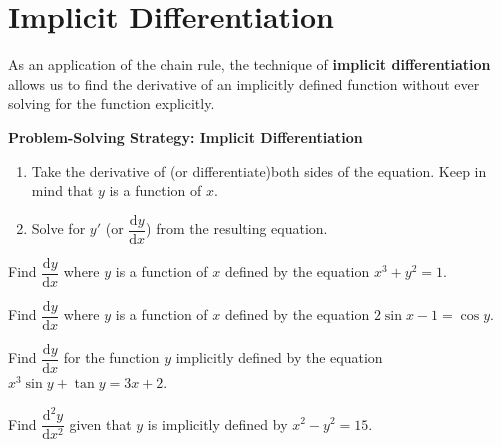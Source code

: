 
\hypertarget{implicit-differentiation}{%
\section{Implicit Differentiation}\label{implicit-differentiation}}

As an application of the chain rule, the technique of \textbf{implicit
differentiation} allows us to find the derivative of an implicitly
defined function without ever solving for the function explicitly.

\textbf{Problem-Solving Strategy: Implicit Differentiation}

\begin{enumerate}[sepno]
\item
  Take the derivative of (or differentiate)both sides of the equation.
  Keep in mind that \(y\) is a function of \(x\).
\item
  Solve for \(y'\) (or \(\dfrac{\mathrm{d}y}{\mathrm{d}x}\)) from the
  resulting equation.
\end{enumerate}

\begin{example}

Find \(\dfrac{\mathrm{d}y}{\mathrm{d}x}\) where \(y\) is a function of
\(x\) defined by the equation \(x^3+y^2=1\).

\end{example}
\vspace*{6\baselineskip}

\begin{example}

Find \(\dfrac{\mathrm{d}y}{\mathrm{d}x}\) where \(y\) is a function of
\(x\) defined by the equation \(2\sin x-1=\cos y\).

\end{example}
\vspace*{6\baselineskip}

\begin{example}

Find \(\dfrac{\mathrm{d}y}{\mathrm{d}x}\) for the function \(y\)
implicitly defined by the equation \(x^3\sin y+\tan y=3x+2\).

\end{example}
\vspace*{6\baselineskip}

\begin{example}

Find \(\dfrac{\mathrm{d}^2y}{\mathrm{d}x^2}\) given that \(y\) is
implicitly defined by \(x^2-y^2=15\).

\end{example}
\vspace*{6\baselineskip}

